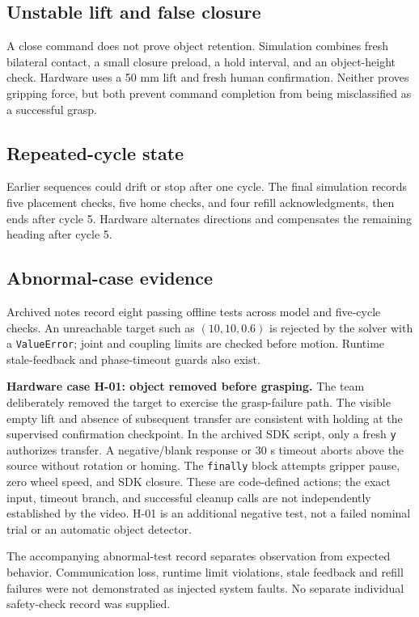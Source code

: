 \documentclass[9pt,a4paper,twocolumn,twoside]{tau-class/tau}
\newcommand{\codepath}[1]{{\small\ttfamily\nolinkurl{#1}}}
\begin{document}
\subsection{Unstable lift and false closure}
A close command does not prove object retention. Simulation combines fresh
bilateral contact, a small closure preload, a hold interval, and an object-height
check. Hardware uses a 50 mm lift and fresh human confirmation. Neither proves
gripping force, but both prevent command completion from being misclassified as
a successful grasp.

\subsection{Repeated-cycle state}
Earlier sequences could drift or stop after one cycle. The final simulation
records five placement checks, five home checks, and four refill acknowledgments,
then ends after cycle 5. Hardware alternates directions and compensates the
remaining heading after cycle 5.

\subsection{Abnormal-case evidence}
Archived notes record eight passing offline tests across model and five-cycle
checks. An unreachable target such as $(10,10,0.6)$ is rejected by the solver
with a \codepath{ValueError}; joint and coupling limits are checked before
motion. Runtime stale-feedback and phase-timeout guards also exist.

\textbf{Hardware case H-01: object removed before grasping.}
The team deliberately removed the target to exercise the grasp-failure path.
The visible empty lift and absence of subsequent transfer are consistent with
holding at the supervised confirmation checkpoint. In the archived SDK script,
only a fresh \codepath{y} authorizes transfer. A negative/blank response or 30 s
timeout aborts above the source without rotation or homing. The \codepath{finally}
block attempts gripper pause, zero wheel speed, and SDK closure. These are
code-defined actions; the exact input, timeout branch, and successful cleanup
calls are not independently established by the video. H-01 is an additional
negative test, not a failed nominal trial or an automatic object detector.

The accompanying abnormal-test record separates observation from expected
behavior. Communication loss, runtime limit violations, stale feedback and
refill failures were not demonstrated as injected system faults. No separate
individual safety-check record was supplied.
\end{document}
